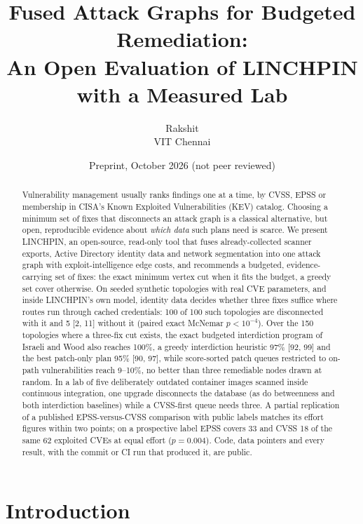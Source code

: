 \documentclass[11pt]{article}
\title{Fused Attack Graphs for Budgeted Remediation:\\
An Open Evaluation of LINCHPIN with a Measured Lab}
\author{Rakshit\\VIT Chennai}
\date{Preprint, October 2026 \quad (not peer reviewed)}
\begin{document}
\maketitle

\begin{abstract}
Vulnerability management usually ranks findings one at a time, by CVSS, EPSS or membership in CISA's Known
Exploited Vulnerabilities (KEV) catalog. Choosing a minimum set of fixes that disconnects an attack graph is a
classical alternative, but open, reproducible evidence about \emph{which data} such plans need is scarce. We present
LINCHPIN, an open-source, read-only tool that fuses already-collected scanner exports, Active Directory identity data
and network segmentation into one attack graph with exploit-intelligence edge costs, and recommends a budgeted,
evidence-carrying set of fixes: the exact minimum vertex cut when it fits the budget, a greedy set cover otherwise.
On seeded synthetic topologies with real CVE parameters, and inside LINCHPIN's own model, identity data decides
whether three fixes suffice where routes run through cached credentials: 100 of 100 such topologies are disconnected
with it and 5 [2, 11] without it (paired exact McNemar $p < 10^{-4}$). Over the 150 topologies where a three-fix cut
exists, the exact budgeted interdiction program of Israeli and Wood also reaches 100\%, a greedy interdiction
heuristic 97\% [92, 99] and the best patch-only plan 95\% [90, 97], while score-sorted patch queues restricted to
on-path vulnerabilities reach 9--10\%, no better than three remediable nodes drawn at random. In a lab of five
deliberately outdated container images scanned inside continuous integration, one upgrade disconnects the database
(as do betweenness and both interdiction baselines) while a CVSS-first queue needs three. A partial replication of a
published EPSS-versus-CVSS comparison with public labels matches its effort figures within two points; on a
prospective label EPSS covers 33 and CVSS 18 of the same 62 exploited CVEs at equal effort ($p = 0.004$). Code, data
pointers and every result, with the commit or CI run that produced it, are public.
\end{abstract}

\section{Introduction}
\end{document}

